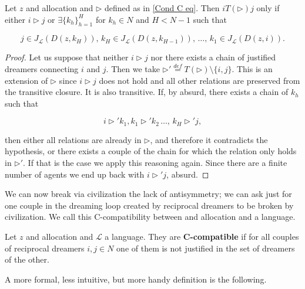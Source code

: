 
\begin{proposition}\label{Prop: cond on transitive closure}
    Let $z$ and allocation and $\triangleright$ defined as in \ref{Cond C eq}. Then $iT(\triangleright)j$ only if either $i\triangleright j$ or $\exists \{k_h\}_{h=1}^H$ for $k_h \in N$ and $H<N-1$ such that

    \[j\in J_{\mathcal{L}}(D(z,k_H)),\, k_H \in J_{\mathcal{L}}(D(z,k_{H-1})),\,\dots,\, k_1\in J_{\mathcal{L}}(D(z,i)).\]

    \begin{proof}
        Let us suppose that neither $i\triangleright j$ nor there exists a chain of justified dreamers connecting $i$ and $j$. Then we take $\triangleright'\overset{def}{=}T(\triangleright)\setminus\{i,j\}$. This is an extension of $\triangleright$ since $i\triangleright j$ does not hold and all other relations are preserved from the transitive closure. It is also transitive. If, by absurd, there exists a chain of $k_h$ such that

        \[i\triangleright'k_1, k_1\triangleright'k_2\,\dots,\,k_H\triangleright'j,\]

        then either all relations are already in $\triangleright$, and therefore it contradicts the hypothesis, or there exists a couple of the chain for which the relation only holds in $\triangleright'$. If that is the case we apply this reasoning again. Since there are a finite number of agents we end up back with $i\triangleright'j$, absurd.
    \end{proof}
\end{proposition}

We can now break via civilization the lack of antisymmetry; we can ask just for one couple in the dreaming loop created by reciprocal dreamers to be broken by civilization. We call this C-compatibility between and allocation and a language.

\begin{definition}
    Let $z$ and allocation and $\mathcal{L}$ a language. They are \textbf{C-compatible} if for all couples of reciprocal dreamers $i,j\in N$ one of them is not justified in the set of dreamers of the other. 
\end{definition}

A more formal, less intuitive, but more handy definition is the following.

